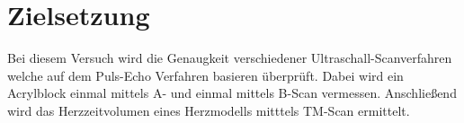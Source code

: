\section{Zielsetzung}
\label{sec:Zielsetzung}
Bei diesem Versuch wird die Genaugkeit verschiedener Ultraschall-Scanverfahren welche auf dem Puls-Echo Verfahren basieren überprüft.
Dabei wird ein Acrylblock einmal mittels A- und einmal mittels B-Scan vermessen. Anschließend wird das Herzzeitvolumen eines Herzmodells mitttels TM-Scan ermittelt. 
